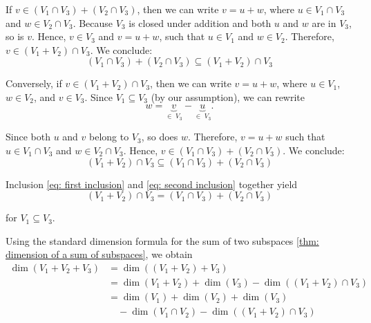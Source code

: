 \begin{xrcs}
\begin{xsol}
    \begin{xprf}
      If $v \in (V_1 \cap V_3) + (V_2 \cap V_3)$, then we can write $v = u + w$, where $u \in V_1\cap V_3$ and  $w \in V_2 \cap V_3$.
      Because $V_3$ is closed under addition and both $u$ and $w$ are in $V_3$, so is $v$. Hence, $v \in V_3$ and $v=u+w$, such that $u \in V_1$ and $w \in V_2$. Therefore, $v \in (V_1 + V_2) \cap V_3$. We conclude:
      \begin{equation}
        \label{eq: first inclusion}
        (V_1 \cap V_3) + (V_2 \cap V_3) \subseteq (V_1 + V_2) \cap V_3
      \end{equation}

      Conversely, if $v \in (V_1 + V_2) \cap V_3$, then we can write $v = u + w$, where $u \in V_1$, $w \in V_2$, and $v \in V_3$. Since $V_1 \subseteq V_3$ (by our assumption), we can rewrite
      \begin{equation}
        w = \underbrace{v}_{\in \; V_3}-\underbrace{u}_{\in \; V_3}.
      \end{equation}

      Since both $u$ and $v$ belong to $V_3$, so does $w$. Therefore, $v=u+w$ such that $u \in V_1 \cap V_3$ and $w \in V_2 \cap V_3$. Hence, $v \in (V_1 \cap V_3) + (V_2 \cap V_3)$. We conclude:
      \begin{equation}
        \label{eq: second inclusion}
        (V_1 + V_2) \cap V_3 \subseteq (V_1 \cap V_3) + (V_2 \cap V_3)
      \end{equation}

      Inclusion \eqref{eq: first inclusion} and \eqref{eq: second inclusion} together yield
      \begin{equation}
        (V_1 + V_2) \cap V_3 = (V_1 \cap V_3) + (V_2 \cap V_3)
      \end{equation}

      for $V_1 \subseteq V_3$.
    \end{xprf}
    Using the standard dimension formula  for the sum of two subspaces \eqref{thm: dimension of a sum of subspaces}, we obtain
    \begin{equation}
      \label{eq: first forumla}
      \begin{aligned}
        \dim (V_1 + V_2 + V_3) &= \dim ((V_1+V_2) + V_3) \\
          &= \dim (V_1 + V_2) + \dim (V_3) - \dim((V_1 +V_2) \cap V_3) \\
          &= \dim (V_1) + \dim (V_2) + \dim (V_3) \\
          & \quad - \dim (V_1 \cap V_2) - \dim ((V_1 + V_2) \cap V_3)
      \end{aligned}
    \end{equation}


\end{xsol}
\end{xrcs}
